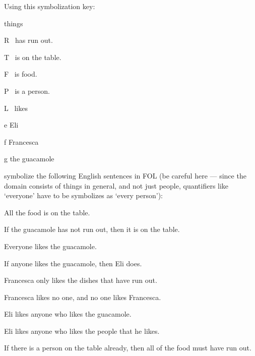 \problempart
Using this symbolization key:
\begin{ekey}
\item[\text{domain}] things
\item[R] \blank\ has run out.
\item[T] \blank\ is on the table.
\item[F] \blank\ is food.
\item[P] \blank\ is a person.
\item[L] \blank\ likes \blank\
\item[e] Eli
\item[f] Francesca
\item[g] the guacamole
\end{ekey}
symbolize the following English sentences in FOL (be careful here --- since the domain consists of things in general, and not just people, quantifiers like `everyone' have to be symbolizes as `every person'):
\begin{earg}
\item All the food is on the table.
\item If the guacamole has not run out, then it is on the table.
\item Everyone likes the guacamole.
\item If anyone likes the guacamole, then Eli does.
\item Francesca only likes the dishes that have run out.
\item Francesca likes no one, and no one likes Francesca.
\item Eli likes anyone who likes the guacamole.
\item Eli likes anyone who likes the people that he likes.
\item If there is a person on the table already, then all of the food must have run out.
\end{earg}


